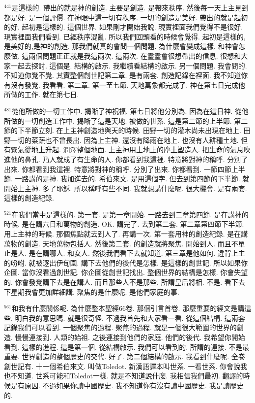 \documentclass{book}
\begin{document}
$^{441}$是這樣的.
帶出的就是神的創造.
主要是創造.
是帶來秩序.
然後每一天上主見到都是好.
是一個評價.
在神眼中這一切有秩序.
一切的創造是美好.
帶出的就是起初的好.
起初是這樣的.
這個世界.
如果剛才開始我說.
現實裡面我們覺得不是很好.
現實裡面我們看到.
已經秩序混亂.
所以我們回頭看的時候會覺得.
起初是這樣的,是美好的,是神的創造.
那我們就真的會問一個問題.
為什麼會變成這樣.
和神會怎麼做.
這兩個問題正正就是我這兩次.
這兩次.
在靈靈會很想帶出的信息.
很想和大家一起去探討.
這個是.
結構的啟示.
我繼續看結構的啟示.
另一個問題.
我會問的.
不知道你覺不覺.
其實整個創世記第二章.
是有兩套.
創造記錄在裡面.
我不知道你有沒有發覺.
我看看.
第二章.
第一至七節.
天地萬象都完成了.
神在第七日完成他所做的工作.
就在第七日.

$^{481}$從他所做的一切工作中.
揭晰了神祝福.
第七日將他分別為.
因為在這日神.
從他所做的一切創造工作中.
揭晰了這是天地.
被做的世系.
這是第二節的上半節.
第二節的下半節立刻.
在上主神創造地與天的時候.
田野一切的灌木尚未出現在地上.
田野一切的菜蔬也不曾長出.
因為上主神.
還沒有降雨在地上.
也沒有人耕種土地.
但有霧氣從地上升起.
潤澤整個地面.
上主神用土地上的塵土塑造人.
把生命的氣息吹進他的鼻孔.
乃人就成了有生命的人.
你都看到我這裡.
特意將對神的稱呼.
分別了出來.
你都看到我這裡.
特意將對神的稱呼.
分別了出來.
你都看到.
一節四節上半節.
一路講的是神.
我加進去的.
希伯來文.
是用這個字.
但去到第四節的下半節.
就開始上主神.
多了耶穌.
所以稱呼有些不同.
我就想講什麼呢.
很大機會.
是有兩套.
這樣的創造紀錄.

$^{521}$在我們當中是這樣的.
第一套.
是第一章開始.
一路去到二章第四節.
是在講神的時候.
是在講六日和萬物的創造.
OK.
講完了.
去到第二套.
第二章第四節下半節.
用上主神的時候.
那個焦點就去到人了.
再講一次.
第一套用神的創造紀錄.
是在講萬物的創造.
天地萬物包括人.
然後第二套.
的創造就將聚焦.
開始到人.
而且不單止是人.
是在講哪人.
和女人.
然後我們看下去就知道.
第三章是他如何.
違背上主的吩咐.
就被逐出伊甸園.
講下去他們的後代是怎樣.
是這樣的創世記.
所以如果你企圖.
當你沒看過創世記.
你企圖從創世記找出.
整個世界的結構是怎樣.
你會失望的.
你會發覺講下去是在講人.
而且那些人不是那些.
所謂皇后將相.
不是.
看下去下星期我會更加詳細講.
聚焦的是什麼呢.
是他們家庭的事.

$^{561}$和我有什麼關係呢.
為什麼整本聖經66卷.
那個引言首卷.
那麼重要的經文是講這些.
明白我的意思嗎.
就是很奇怪.
不過我首先和大家看一看.
從這個結構.
這兩套記錄我們可以看到.
一個聚焦的過程.
聚焦的過程.
就是一個很大範圍的世界的創造.
慢慢連接到.
人類的始祖.
之後連接到他們的家庭.
他們的後代.
我希望你開始看到.
這樣的進程.
這是第一個.
從結構啟示.
我們可以看到的.
所謂的連接.
不是最重要.
世界創造的整個歷史的交代.
好了.
第二個結構的啟示.
我看到什麼呢.
全卷創世記有.
十一個希伯來文.
叫做Toledot.
新漢語譯本叫世系.
一看世系.
你會說我也不知道.
世系可能和Toledot一樣.
就是不知道說什麼.
我相信我們最初.
翻譯的時候是有原因.
不過如果你讀中國歷史.
我不知道你有沒有讀中國歷史.
我是讀歷史的.
\end{document}
